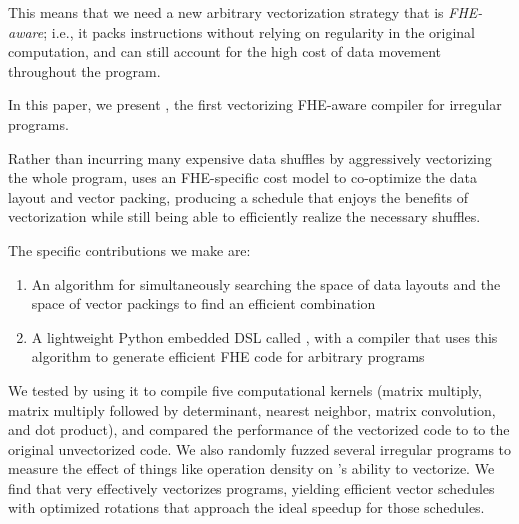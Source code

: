 This means that we need a new arbitrary vectorization strategy that is {\em FHE-aware}; i.e., it packs instructions without relying on regularity in the original computation, and can still account for the high cost of data movement throughout the program.

In this paper, we present \system, the first vectorizing FHE-aware compiler for irregular programs. 

Rather than incurring many expensive data shuffles by aggressively vectorizing the whole program, \system uses an FHE-specific cost model to co-optimize the data layout and vector packing, producing a schedule that enjoys the benefits of vectorization while still being able to efficiently realize the necessary shuffles. 

The specific contributions we make are:
\begin{enumerate}
    \item An algorithm for simultaneously searching the space of data layouts and the space of vector packings to find an efficient combination%
    \item A lightweight Python embedded DSL called \system, with a compiler that uses this algorithm to generate efficient FHE code for arbitrary programs
\end{enumerate}

We tested \system by using it to compile five computational kernels (matrix multiply, matrix multiply followed by determinant, nearest neighbor, matrix convolution, and dot product), and compared the performance of the vectorized code to to the original unvectorized code.
We also randomly fuzzed several irregular programs to measure the effect of things like operation density on \system's ability to vectorize. We find that \system very effectively vectorizes programs, yielding efficient vector schedules with optimized rotations that approach the ideal speedup for those schedules.

